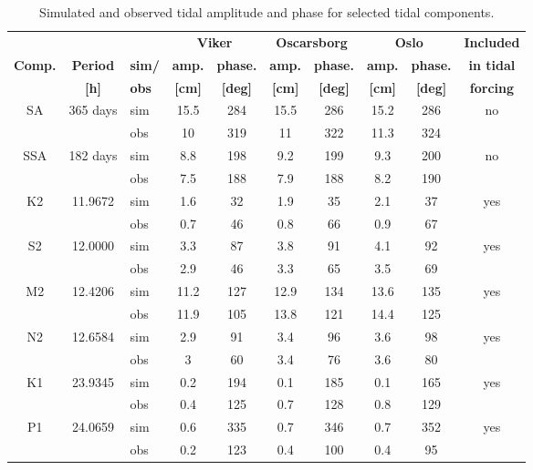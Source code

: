 \documentclass[12pt,a4paper,english]{article}
\begin{document}
\begin{table}[ht]
\caption{Simulated and observed tidal amplitude and phase for selected tidal components.}
\label{tab:Tide}
\centering
\begin{tabular}{|c|c|l|cc|cc|cc|c|}
\hline 
&&& \multicolumn{2}{|c|}{\bf Viker} & \multicolumn{2}{|c|}{\bf Oscarsborg} & \multicolumn{2}{|c|}{\bf Oslo} & {\bf Included} \\ 
{\bf Comp.} & {\bf Period} &  {\bf sim/} & {\bf amp.} & {\bf phase.} & {\bf amp.} & {\bf phase.} & {\bf amp.} & {\bf phase.} & {\bf in tidal} \\
& {\bf [h]} & {\bf obs} & {\bf [cm]} & {\bf [deg]} & {\bf [cm]} & {\bf [deg]} & {\bf [cm]} & {\bf [deg]} & {\bf forcing} \\ \hline
\small SA   & 365 days & sim & 15.5 & 284 & 15.5 & 286 & 15.2 & 286 & no   \\
\small      &        & obs & 10 & 319 & 11 & 322 & 11.3 & 324 &    \\
\small SSA  & 182 days & sim & 8.8 & 198 & 9.2 & 199 & 9.3 & 200 & no  \\
\small      &        & obs & 7.5 & 188 & 7.9 & 188 & 8.2 & 190 &    \\
\small K2   & 11.9672 & sim & 1.6 & 32 & 1.9 & 35 & 2.1 & 37 & yes  \\
\small      &        & obs & 0.7 & 46 & 0.8 & 66 & 0.9 & 67 &    \\
\small S2   & 12.0000 & sim & 3.3 & 87 & 3.8 & 91 & 4.1 & 92 & yes  \\
\small      &        & obs & 2.9 & 46 & 3.3 & 65 & 3.5 & 69 &    \\
\small M2   & 12.4206 & sim & 11.2 & 127 & 12.9 & 134 & 13.6 & 135 & yes  \\
\small      &        & obs & 11.9 & 105 & 13.8 & 121 & 14.4 & 125 &    \\
\small N2   & 12.6584 & sim & 2.9 & 91 & 3.4 & 96 & 3.6 & 98 & yes  \\
\small      &        & obs & 3 & 60 & 3.4 & 76 & 3.6 & 80 &    \\
\small K1   & 23.9345 & sim & 0.2 & 194 & 0.1 & 185 & 0.1 & 165 & yes  \\
\small      &        & obs & 0.4 & 125 & 0.7 & 128 & 0.8 & 129 &    \\
\small P1   & 24.0659 & sim & 0.6 & 335 & 0.7 & 346 & 0.7 & 352 & yes  \\
\small      &        & obs & 0.2 & 123 & 0.4 & 100 & 0.4 & 95 &    \\

\end{tabular}
\end{table}
\end{document}
